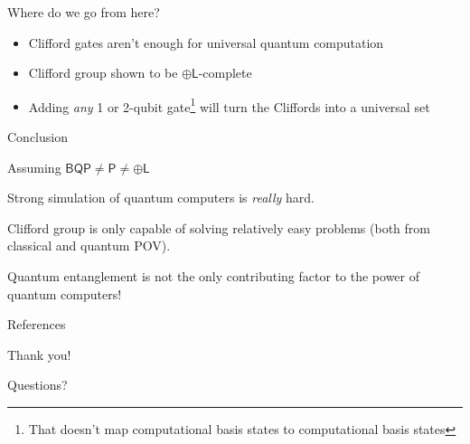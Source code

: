 \documentclass[11pt,aspectratio=1610]{beamer}
\begin{document}
\begin{frame}{Where do we go from here?}
	\begin{itemize}[<+->]
		\item Clifford gates aren't enough for universal quantum computation
		\item Clifford group shown to be $\oplus\bm{\mathsf{L}}$-complete \cite{aaronson}
		\item Adding \emph{any} 1 or 2-qubit gate\footnote<3->{That doesn't map computational basis states to computational basis states} will turn the Cliffords into a universal set \cite{shi}
	\end{itemize}
\end{frame}

\begin{frame}{Conclusion}
	\begin{alertblock}{Assuming}
		$\bm{\mathsf{BQP}}\neq\bm{\mathsf{P}}\neq\oplus\bm{\mathsf{L}}$
	\end{alertblock}
	Strong simulation of quantum computers is \emph{really} hard.

	Clifford group is only capable of solving relatively easy problems (both from classical and quantum POV).

	Quantum entanglement is not the only contributing factor to the power of quantum computers!
\end{frame}

\begin{frame}[allowframebreaks]{References}
	\nocite{*}
	
	
\end{frame}

\begin{frame}[standout]
	\smiley Thank you!\smiley

	Questions?
\end{frame}
\end{document}

